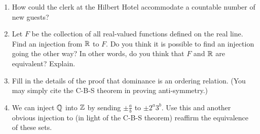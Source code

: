 \begin{enumerate}
\item How could the clerk at the Hilbert Hotel accommodate a countable
number of new guests?
\item Let $F$ be the collection of all real-valued functions 
defined on the real line.  Find an injection from ${\mathbb R}$ to $F$.  Do you 
think it is possible to find an injection going the other way?  In 
other words, do you think that $F$ and ${\mathbb R}$ are equivalent?  Explain.
\item Fill in the details of the proof that dominance is an ordering relation.
(You may simply cite the C-B-S theorem in proving anti-symmetry.)
\item We can inject ${\mathbb Q}$ into ${\mathbb Z}$ by sending 
$\displaystyle \pm \frac{a}{b}$ to $\displaystyle \pm 2^a3^b$.  
 Use this and another obvious injection to (in light of the C-B-S 
theorem) reaffirm the equivalence of these sets.
\end{enumerate}



